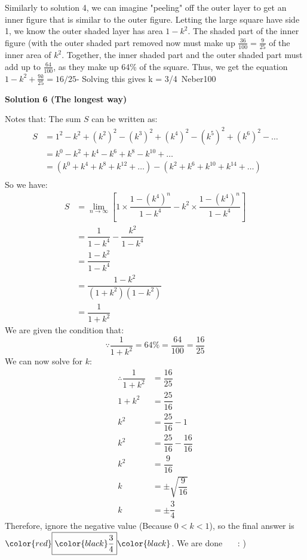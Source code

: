 \begin{enumerate}
Similarly to solution 4, we can imagine "peeling" off the outer layer to get an inner figure that is similar to the outer figure. Letting the large square have side 1, we know the outer shaded layer has area $1-k^2$. The shaded part of the inner figure (with the outer shaded part removed now must make up $\frac{36}{100} = \frac{9}{25}$ of the inner area of $k^2$. Together, the inner shaded part and the outer shaded part must add up to $\frac{64}{100}$, as they make up 64\% of the square. Thus, we get the equation$1-k^2 + \frac{9k}{25} = 16/25$- Solving this gives k = 3/4~Neber100

 



\textbf{Solution 6 (The longest way)}

Notes that: The sum $S$ can be written as:
 \begin{align*}     S &= 1^2 - k^2 + (k^2)^2 - (k^3)^2 + (k^4)^2 - (k^5)^2 + (k^6)^2 - \dots \\     &= k^0 - k^2 + k^4 - k^6 + k^8 - k^{10} + \dots \\     &= (k^0 + k^4 + k^8 + k^{12} + \dots) - (k^2 + k^6 + k^{10} + k^{14} + \dots) \\ \end{align*}
So we have: 
 \begin{align*}     S &= \lim_{n\rightarrow\infty}\left[1\times\dfrac{1-(k^4)^n}{1-k^4}-k^2\times\dfrac{1-(k^4)^n}{1-k^4}\right]\\     &= \dfrac{1}{1-k^4}-\dfrac{k^2}{1-k^4} \\     &= \dfrac{1-k^2}{1-k^4} \\     &= \dfrac{1-k^2}{(1+k^2)(1-k^2)} \\     &= \dfrac{1}{1+k^2} \end{align*}
We are given the condition that:
 \[\because \dfrac{1}{1+k^2}=64\%=\dfrac{64}{100}=\dfrac{16}{25}\]We can now solve for $k$:
 \begin{align*}   \therefore \dfrac{1}{1+k^2} &= \dfrac{16}{25} \\   1+k^2 &= \dfrac{25}{16} \\   k^2 &= \dfrac{25}{16} - 1 \\   k^2 &= \dfrac{25}{16} - \dfrac{16}{16} \\   k^2 &= \dfrac{9}{16} \\   k &= \pm\sqrt{\dfrac{9}{16}} \\   k &= \pm\dfrac{3}{4} \end{align*}
Therefore, ignore the negative value (Because \(0<k<1\)), so the final answer is $\color{red}\boxed{\color{black}\dfrac{3}{4}}\color{black}$. We are done ~~ : )


\end{enumerate}

